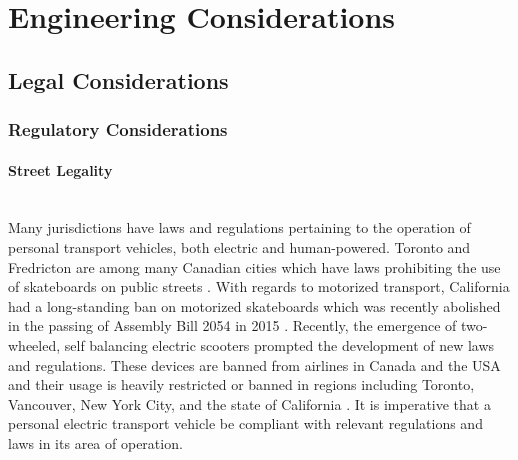 \section{Engineering Considerations}
\subsection{Legal Considerations}

\subsubsection{Regulatory Considerations}

\paragraph{Street Legality}\mbox{}\\
Many jurisdictions have laws and regulations pertaining to the operation of personal transport vehicles, both electric and human-powered. 
Toronto and Fredricton are among many Canadian cities which have laws prohibiting the use of skateboards on public streets \cite{TOLaws}. 
With regards to motorized transport, California had a long-standing ban on motorized skateboards which was recently abolished in the passing of Assembly Bill 2054 in 2015 \cite{OCLaws} \cite{WSJLaws}.
Recently, the emergence of two-wheeled, self balancing electric scooters prompted the development of new laws and regulations. 
These devices are banned from airlines in Canada and the USA and their usage is heavily restricted or banned in regions including Toronto, Vancouver, New York City, and the state of California \cite{leetboard}.
It is imperative that a personal electric transport vehicle be compliant with relevant regulations and laws in its area of operation.



